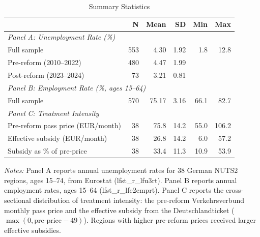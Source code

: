 \begin{table}[H]
\centering
\caption{Summary Statistics}
\label{tab:summary}
\begin{threeparttable}
\begin{tabular}{lrrrrr}
\toprule
 & N & Mean & SD & Min & Max \\
\midrule
\multicolumn{6}{l}{\textit{Panel A: Unemployment Rate (\%)}} \\
\quad Full sample & 553 & 4.30 & 1.92 & 1.8 & 12.8 \\
\quad Pre-reform (2010--2022) & 480 & 4.47 & 1.99 & & \\
\quad Post-reform (2023--2024) & 73 & 3.21 & 0.81 & & \\
\midrule
\multicolumn{6}{l}{\textit{Panel B: Employment Rate (\%, ages 15--64)}} \\
\quad Full sample & 570 & 75.17 & 3.16 & 66.1 & 82.7 \\
\midrule
\multicolumn{6}{l}{\textit{Panel C: Treatment Intensity}} \\
\quad Pre-reform pass price (EUR/month) & 38 & 75.8 & 14.2 & 55.0 & 106.2 \\
\quad Effective subsidy (EUR/month) & 38 & 26.8 & 14.2 & 6.0 & 57.2 \\
\quad Subsidy as \% of pre-price & 38 & 33.4 & 11.3 & 10.9 & 53.9 \\
\bottomrule
\end{tabular}
\begin{tablenotes}[flushleft]
\small
\item \textit{Notes:} Panel A reports annual unemployment rates for 38 German NUTS2 regions, ages 15--74, from Eurostat (lfst\_r\_lfu3rt). Panel B reports annual employment rates, ages 15--64 (lfst\_r\_lfe2emprt). Panel C reports the cross-sectional distribution of treatment intensity: the pre-reform Verkehrsverbund monthly pass price and the effective subsidy from the Deutschlandticket ($\max(0, \text{pre-price} - 49)$). Regions with higher pre-reform prices received larger effective subsidies.
\end{tablenotes}
\end{threeparttable}
\end{table}
